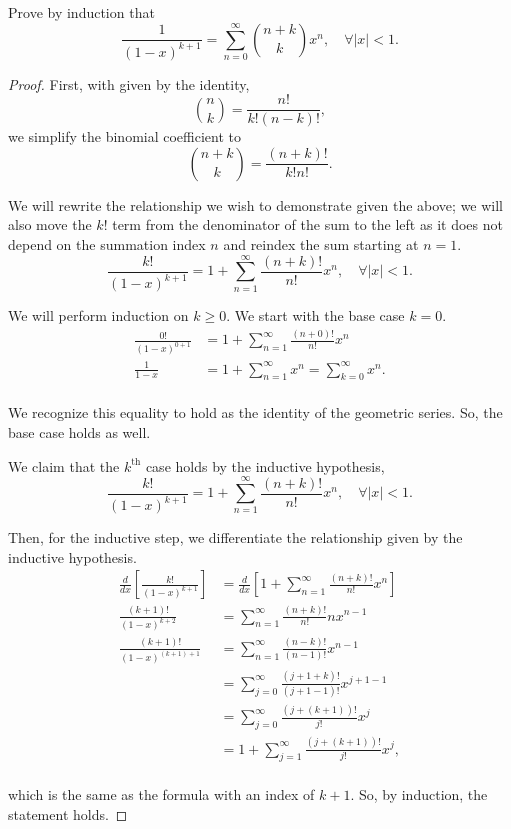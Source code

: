 \documentclass[../hw4]{subfiles}
\begin{document}
Prove by induction that \[\frac{1}{{(1-x)}^{k+1}}=\sum_{n=0}^{\infty}\binom{n+k}{k}x^n, \quad \forall|x|<1.\] 

\begin{proof}

First, with given by the identity, \[\binom{n}{k}=\frac{n!}{k!(n-k)!},\]
we simplify the binomial coefficient to \[\binom{n+k}{k}=\frac{(n+k)!}{k!n!}.\]

We will rewrite the relationship we wish to demonstrate given the above; we will also move the $k!$ term from the denominator of the sum to the left as it does not depend on the summation index $n$ and reindex the sum starting at $n=1$. 
\[\frac{k!}{{(1-x)}^{k+1}}=1+\sum_{n=1}^{\infty}\frac{(n+k)!}{n!}x^n, \quad \forall|x|<1.\]

We will perform induction on $k\geq0$. We start with the base case $k=0$.
\begin{align*}
    \frac{0!}{{(1-x)}^{0+1}}&=1+\sum_{n=1}^{\infty}\frac{(n+0)!}{n!}x^n \\
    \frac{1}{1-x}&=1+\sum_{n=1}^{\infty}x^n=\sum_{k=0}^{\infty}x^n. \\
\end{align*}

We recognize this equality to hold as the identity of the geometric series. So, the base case holds as well.

We claim that the $k^{\text{th}}$ case holds by the inductive hypothesis,
\[\frac{k!}{{(1-x)}^{k+1}}=1+\sum_{n=1}^{\infty}\frac{(n+k)!}{n!}x^n, \quad \forall|x|<1.\]

Then, for the inductive step, we differentiate the relationship given by the inductive hypothesis. 
\begin{align*}
    \frac{d}{dx}\left[ \frac{k!}{{(1-x)}^{k+1}} \right] &= \frac{d}{dx}\left[1+\sum_{n=1}^{\infty}\frac{(n+k)!}{n!}x^n\right] \\
    \frac{(k+1)!}{{(1-x)}^{k+2}}&=\sum_{n=1}^{\infty}\frac{(n+k)!}{n!}nx^{n-1} \\
    \frac{(k+1)!}{{(1-x)}^{(k+1)+1}}&= \sum_{n=1}^{\infty} \frac{(n-k)!}{(n-1)!}x^{n-1} \\
    &= \sum_{j=0}^{\infty} \frac{(j+1+k)!}{(j+1-1)!}x^{j+1-1} \\
    &= \sum_{j=0}^{\infty} \frac{(j+(k+1))!}{j!}x^j \\
    &= 1 + \sum_{j=1}^{\infty} \frac{(j+(k+1))!}{j!}x^j, \\
\end{align*}

which is the same as the formula with an index of $k+1$. So, by induction, the statement holds.
    
\end{proof}
\end{document}

